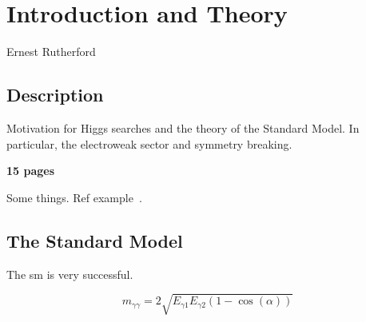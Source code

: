 \chapter{Introduction and Theory}
\label{chap:intro}
{Ernest Rutherford}

\section{Description}

Motivation for Higgs searches and the theory of the Standard Model. In particular, the electroweak sector and symmetry breaking.

\textbf{15 pages}

Some things. Ref example~\cite{Phys.Rev.Lett.19.1264, Phys.Rev.D2.1285,hep-ph/0410370}.

\section{The Standard Model}
\label{sec:standardmodel}

The \acf{sm} is very successful.


\begin{equation}
	m_{\gamma\gamma} = 2\sqrt{E_{\gamma1}E_{\gamma2}(1-\cos(\alpha))}
\label{eq:invmass}
\end{equation}
